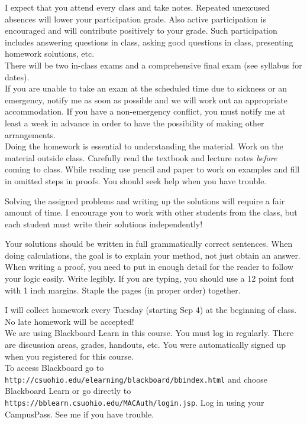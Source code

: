 \documentclass[11pt]{article}
\begin{document}
I expect that  you attend every class and take notes. Repeated
unexcused absences will lower your participation grade.
Also active participation is encouraged and will contribute
positively to your grade. Such participation includes answering
questions in class, asking good questions in class, presenting
homework solutions, etc. \\

There will be two in-class exams and a comprehensive final exam (see
syllabus for dates). \\

If you are unable to take an exam at the scheduled time due to
sickness or an emergency, notify me as soon as possible and we will
work out an appropriate accommodation. If you have a non-emergency
conflict, you must notify me at least a week in
advance in order to have the possibility of making other arrangements.\\

Doing the homework is essential to understanding the material. 
Work on the material outside class. Carefully read the textbook and lecture notes {\it before}
coming to class. While reading use pencil and paper to work on examples and fill in
omitted steps in proofs.  You should seek help when you have trouble.

Solving the assigned problems and writing up the solutions will require a fair amount of time.
I encourage you to work with other students from the class, but each student
must write their solutions independently! 

 Your solutions
should be written in full grammatically correct sentences. 
 When doing calculations, the goal is to explain your
method, not just obtain an answer. When writing a proof, you need to put in enough detail
for the reader to follow your logic easily.
Write legibly. If you are typing, you should use a 12 point
font with 1 inch margins. Staple the pages (in proper order) together.

I will collect homework every Tuesday (starting Sep 4) at the beginning of class. 
No late homework will be accepted!\\



 
 We are using Blackboard Learn in this course.
You must log in regularly. There are discussion areas,
grades, handouts, etc. You were automatically signed up when
you registered for this course.\\ To access Blackboard go to
{\tt http://csuohio.edu/elearning/blackboard/bbindex.html} and choose Blackboard Learn
or go directly to
{\tt https://bblearn.csuohio.edu/MACAuth/login.jsp}. Log in using your
CampusPass. See me if you have trouble.\\
\end{document}
